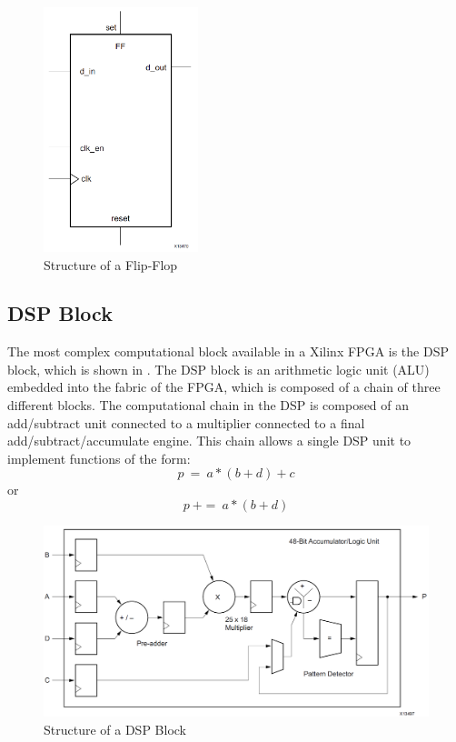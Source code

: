 \begin{figure}[H]
  \begin{center}
      \includegraphics[width=0.4\textwidth]{images/flipflop.png}
      \caption{Structure of a Flip-Flop}
      \label{flipflop}
  \end{center}
\end{figure}
\clearpage

\subsection{DSP Block}
The most complex computational block available in a Xilinx FPGA is the DSP block, which is
shown in . The DSP block is an arithmetic logic unit (ALU) embedded into the
fabric of the FPGA, which is composed of a chain of three different blocks. The
computational chain in the DSP is composed of an add/subtract unit connected to a
multiplier connected to a final add/subtract/accumulate engine. This chain allows a single
DSP unit to implement functions of the form:
\[ p \: =\: a*( b + d) + c\] 
or
\[ p \: +=\: a*( b + d) \] 

\begin{figure}[H]
  \begin{center}
      \includegraphics[width=\textwidth]{images/dsp.png}
      \caption{Structure of a DSP Block}
      \label{dsp}
  \end{center}
\end{figure}

